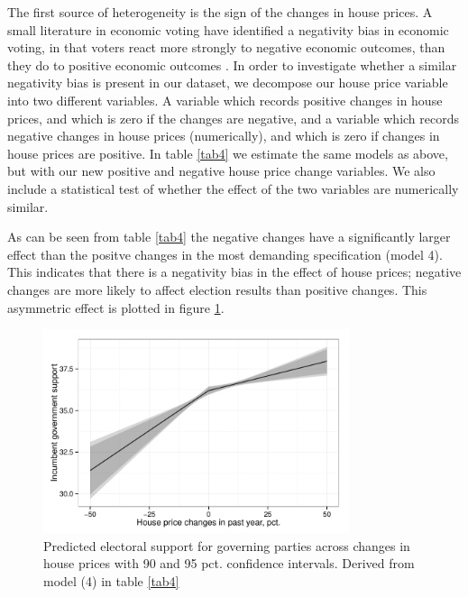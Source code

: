 \documentclass[12pt,a4paper]{article}
\begin{document}
The first source of heterogeneity is the sign of the changes in house prices. A small literature in economic voting have identified a negativity bias in economic voting, in that voters react more strongly to negative economic outcomes, than they do to positive economic outcomes \citep[e.g.][]{bloom1975voter}. In order to investigate whether a similar negativity bias is present in our dataset, we decompose our house price variable into two different variables. A variable which records positive changes in house prices, and which is zero if the changes are negative, and a variable which records negative changes in house prices (numerically), and which is zero if changes in house prices are positive. In table \ref{tab4} we estimate the same models as above, but with our new positive and negative house price change variables. We also include a statistical test of whether the effect of the two variables are numerically similar. 

As can be seen from table \ref{tab4} the negative changes have a significantly larger effect than the positve changes in the most demanding specification (model 4). This indicates that there is a negativity bias in the effect of house prices; negative changes are more likely to affect election results than positive changes. This asymmetric effect is plotted in figure \ref{posneg}.






\begin{figure}[htbp]
	\includegraphics[page=1,width=0.8\textwidth]{../figures/posnegplot}
	\centering
	\caption{Predicted electoral support for governing parties across changes in house prices with 90 and 95 pct. confidence intervals. Derived from model (4) in table \ref{tab4}}
	\label{posneg}
\end{figure}
\end{document}
